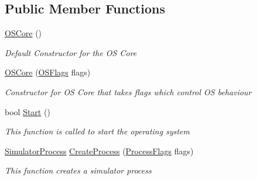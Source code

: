 \subsection*{Public Member Functions}
\begin{DoxyCompactItemize}
\item 
\hyperlink{class_c_p_u___o_s___simulator_1_1_operating___system_1_1_o_s_core_a3845ed83851b87e64d6918a2a495e45e}{O\+S\+Core} ()
\begin{DoxyCompactList}\small\item\em Default Constructor for the O\+S Core \end{DoxyCompactList}\item 
\hyperlink{class_c_p_u___o_s___simulator_1_1_operating___system_1_1_o_s_core_a65c809ada2e4d0d5f6269e6a9009db0d}{O\+S\+Core} (\hyperlink{struct_c_p_u___o_s___simulator_1_1_operating___system_1_1_o_s_flags}{O\+S\+Flags} flags)
\begin{DoxyCompactList}\small\item\em Constructor for O\+S Core that takes flags which control O\+S behaviour \end{DoxyCompactList}\item 
bool \hyperlink{class_c_p_u___o_s___simulator_1_1_operating___system_1_1_o_s_core_adb8186aefcc47d02daa0856e5c9c42b7}{Start} ()
\begin{DoxyCompactList}\small\item\em This function is called to start the operating system \end{DoxyCompactList}\item 
\hyperlink{class_c_p_u___o_s___simulator_1_1_operating___system_1_1_simulator_process}{Simulator\+Process} \hyperlink{class_c_p_u___o_s___simulator_1_1_operating___system_1_1_o_s_core_afee9dd12629e415c420fc7c197f784c4}{Create\+Process} (\hyperlink{struct_c_p_u___o_s___simulator_1_1_operating___system_1_1_process_flags}{Process\+Flags} flags)
\begin{DoxyCompactList}\small\item\em This function creates a simulator process \end{DoxyCompactList}\end{DoxyCompactItemize}
